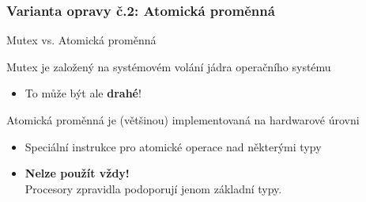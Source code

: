 \documentclass[usenames,dvipsnames,9pt]{beamer}
\begin{document}

%  
%
%    
%
%    
%    


\begin{frame}
  \frametitle{Varianta opravy č.2: Atomická proměnná}
  \begin{center}
    \Large Mutex vs. Atomická proměnná
  \end{center}
  \vspace{3em}
  Mutex je založený na systémovém volání jádra operačního systému
  \begin{itemize}
    \item To může být ale \textbf{drahé}! %
  \end{itemize}
  \vspace{2em}
  \pause
  Atomická proměnná je (většinou) implementovaná na hardwarové úrovni
  \begin{itemize}
    \item Speciální instrukce pro atomické operace nad některými typy
    \pause
    \item \faWarning \hspace{3pt} \textbf{Nelze použít vždy!} \\
          \hspace{20pt} Procesory zpravidla podoporují jenom základní typy.
  \end{itemize}
\end{frame}
\end{document}
